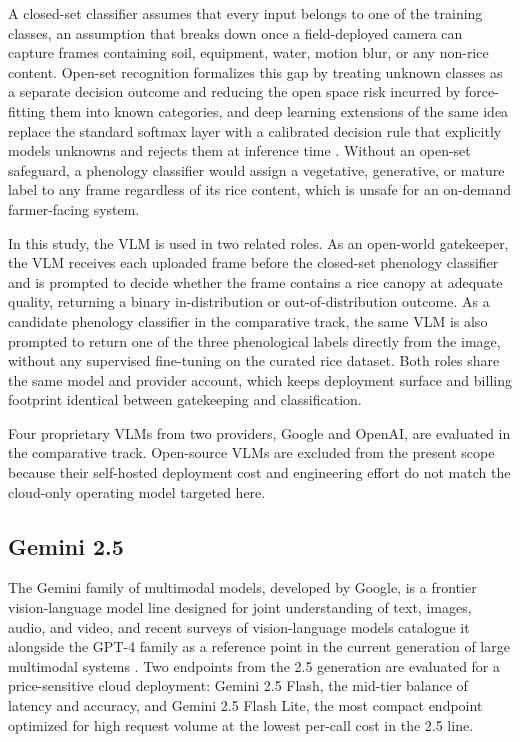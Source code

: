 A closed-set classifier assumes that every input belongs to one of the training classes, an assumption that breaks down once a field-deployed camera can capture frames containing soil, equipment, water, motion blur, or any non-rice content. Open-set recognition formalizes this gap by treating unknown classes as a separate decision outcome and reducing the open space risk incurred by force-fitting them into known categories, and deep learning extensions of the same idea replace the standard softmax layer with a calibrated decision rule that explicitly models unknowns and rejects them at inference time \cite{geng2021openset}. Without an open-set safeguard, a phenology classifier would assign a vegetative, generative, or mature label to any frame regardless of its rice content, which is unsafe for an on-demand farmer-facing system.

In this study, the VLM is used in two related roles. As an open-world gatekeeper, the VLM receives each uploaded frame before the closed-set phenology classifier and is prompted to decide whether the frame contains a rice canopy at adequate quality, returning a binary in-distribution or out-of-distribution outcome. As a candidate phenology classifier in the comparative track, the same VLM is also prompted to return one of the three phenological labels directly from the image, without any supervised fine-tuning on the curated rice dataset. Both roles share the same model and provider account, which keeps deployment surface and billing footprint identical between gatekeeping and classification.

Four proprietary VLMs from two providers, Google and OpenAI, are evaluated in the comparative track. Open-source VLMs are excluded from the present scope because their self-hosted deployment cost and engineering effort do not match the cloud-only operating model targeted here.

\subsection{Gemini 2.5}

The Gemini family of multimodal models, developed by Google, is a frontier vision-language model line designed for joint understanding of text, images, audio, and video, and recent surveys of vision-language models catalogue it alongside the GPT-4 family as a reference point in the current generation of large multimodal systems \cite{zhang2024vlmsurvey}. Two endpoints from the 2.5 generation are evaluated for a price-sensitive cloud deployment: Gemini 2.5 Flash, the mid-tier balance of latency and accuracy, and Gemini 2.5 Flash Lite, the most compact endpoint optimized for high request volume at the lowest per-call cost in the 2.5 line.

